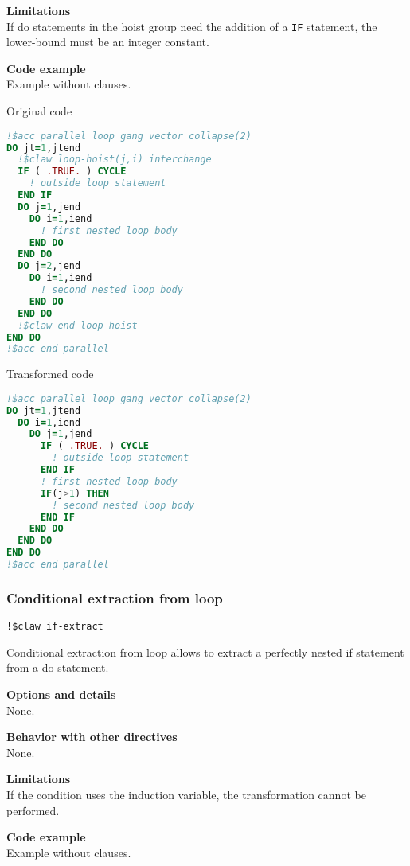\textbf{Limitations}\\
If do statements in the hoist group need the addition of a \lstinline|IF|
statement, the lower-bound must be an integer constant.

\textbf{Code example}\\
\label{loop-hoist1}
Example without clauses.

Original code
\begin{lstlisting}[language=Fortran]
!$acc parallel loop gang vector collapse(2)
DO jt=1,jtend
  !$claw loop-hoist(j,i) interchange
  IF ( .TRUE. ) CYCLE
    ! outside loop statement
  END IF
  DO j=1,jend
    DO i=1,iend
      ! first nested loop body
    END DO
  END DO
  DO j=2,jend
    DO i=1,iend
      ! second nested loop body
    END DO
  END DO
  !$claw end loop-hoist
END DO
!$acc end parallel
\end{lstlisting}


Transformed code
\begin{lstlisting}[language=Fortran]
!$acc parallel loop gang vector collapse(2)
DO jt=1,jtend
  DO i=1,iend
    DO j=1,jend
      IF ( .TRUE. ) CYCLE
        ! outside loop statement
      END IF
      ! first nested loop body
      IF(j>1) THEN
        ! second nested loop body
      END IF
    END DO
  END DO
END DO
!$acc end parallel
\end{lstlisting}

%
%
\subsubsection{Conditional extraction from loop}
\begin{lstlisting}
!$claw if-extract
\end{lstlisting}

Conditional extraction from loop allows to extract a perfectly nested if
statement from a do statement.

\textbf{Options and details}\\
None.

\textbf{Behavior with other directives}\\
None.

\textbf{Limitations}\\
If the condition uses the induction variable, the transformation cannot be
performed.

\textbf{Code example}\\
\label{if-extract-1}
Example without clauses.

